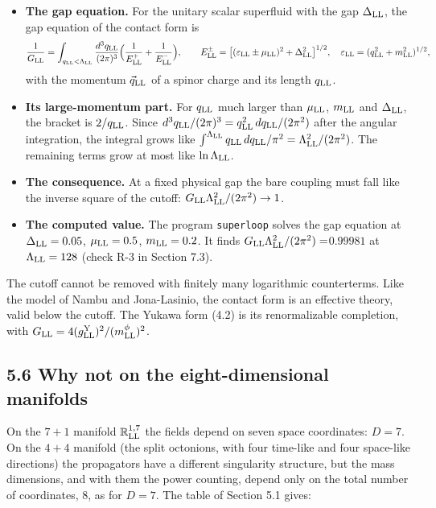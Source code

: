 \documentclass[
  10pt,
]{article}
\providecommand{\tightlist}{%
  \setlength{\itemsep}{0pt}\setlength{\parskip}{0pt}}
\begin{document}
\begin{itemize}
\tightlist
\item
  \textbf{The gap equation.} For the unitary scalar superfluid with the
  gap \(\Delta_{\rm LL}\), the gap equation of the contact form is
  \[\frac1{G_{\rm LL}}=\int_{q_{\rm LL}<\Lambda_{\rm LL}}\frac{d^3q_{\rm LL}}{(2\pi)^3}\Big(\frac1{E^+_{\rm LL}}+\frac1{E^-_{\rm LL}}\Big),\qquad E^\pm_{\rm LL}=\big[(\varepsilon_{\rm LL}\pm\mu_{\rm LL})^2+\Delta_{\rm LL}^2\big]^{1/2},\quad\varepsilon_{\rm LL}=(q_{\rm LL}^2+m_{\rm LL}^2)^{1/2},\]
  with the momentum \(\vec q_{\rm LL}\) of a spinor charge and its
  length \(q_{\rm LL}\).
\item
  \textbf{Its large-momentum part.} For \(q_{\rm LL}\) much larger than
  \(\mu_{\rm LL}\), \(m_{\rm LL}\) and \(\Delta_{\rm LL}\), the bracket
  is \(2/q_{\rm LL}\). Since
  \(d^3q_{\rm LL}/(2\pi)^3=q_{\rm LL}^2\,dq_{\rm LL}/(2\pi^2)\) after
  the angular integration, the integral grows like
  \(\int^{\Lambda_{\rm LL}}q_{\rm LL}\,dq_{\rm LL}/\pi^2=\Lambda_{\rm LL}^2/(2\pi^2)\).
  The remaining terms grow at most like \(\ln\Lambda_{\rm LL}\).
\item
  \textbf{The consequence.} At a fixed physical gap the bare coupling
  must fall like the inverse square of the cutoff:
  \(G_{\rm LL}\Lambda_{\rm LL}^2/(2\pi^2)\to1\).
\item
  \textbf{The computed value.} The program \texttt{superloop} solves the
  gap equation at \(\Delta_{\rm LL}=0.05\), \(\mu_{\rm LL}=0.5\),
  \(m_{\rm LL}=0.2\). It finds
  \(G_{\rm LL}\Lambda_{\rm LL}^2/(2\pi^2)=\)\(0.99981\) at
  \(\Lambda_{\rm LL}=128\) (check R-3 in Section 7.3).
\end{itemize}

The cutoff cannot be removed with finitely many logarithmic
counterterms. Like the model of Nambu and Jona-Lasinio, the contact form
is an effective theory, valid below the cutoff. The Yukawa form (4.2) is
its renormalizable completion, with
\(G_{\rm LL}=4(g^{\rm Y}_{\rm LL})^2/(m^\phi_{\rm LL})^2\).

\hypertarget{why-not-on-the-eight-dimensional-manifolds}{%
\subsection{5.6 Why not on the eight-dimensional
manifolds}\label{why-not-on-the-eight-dimensional-manifolds}}

On the \(7+1\) manifold \(\mathbb R^{1,7}_{\rm LL}\) the fields depend
on seven space coordinates: \(D=7\). On the \(4+4\) manifold (the split
octonions, with four time-like and four space-like directions) the
propagators have a different singularity structure, but the mass
dimensions, and with them the power counting, depend only on the total
number of coordinates, 8, as for \(D=7\). The table of Section 5.1
gives:
\end{document}
